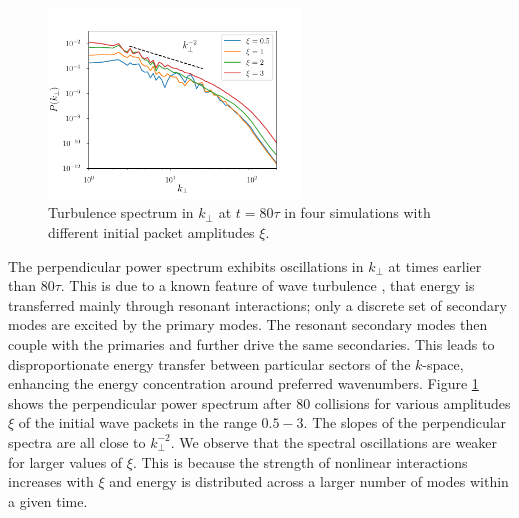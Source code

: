 \begin{figure} [h]
\centering
\includegraphics[width=0.6\textwidth]{pics/chap4/spec3Dst}
\caption[Turbulence spectrum in $k_\perp$ in four 3D simulations]{
Turbulence spectrum in $k_\perp$ at $t=80\tau$ in four simulations with different initial packet amplitudes $\xi$.
}
\label{spec3Dst}
\end{figure}

The perpendicular power spectrum exhibits oscillations in $k_\perp$ at times earlier than $80\tau$.
This is due to a known feature of wave turbulence \citep{2011LNP...825.....N}, that energy is transferred mainly through resonant interactions; only a discrete set of secondary modes are excited by the primary modes. The resonant secondary modes then couple with the primaries and further drive the same secondaries. This leads to disproportionate energy transfer between particular sectors of the $k$-space, enhancing the energy concentration around preferred wavenumbers.
Figure \ref{spec3Dst} shows the perpendicular power spectrum after 80 collisions for various amplitudes $\xi$ of the initial wave packets in the range $0.5 - 3$.
The slopes of the perpendicular spectra are all close to $k_\perp^{-2}$.
We observe that the spectral oscillations are weaker for larger values of $\xi$.
This is because the strength of nonlinear interactions increases with $\xi$ and energy is distributed across a larger number of modes within a given time.

